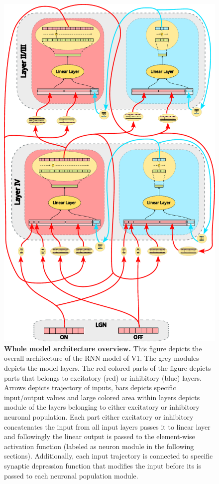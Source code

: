 \begin{figure}
    \centering
    \includegraphics[width=0.85\linewidth]{img/model_architecture.pdf}
    \caption{\textbf{Whole model architecture overview.} This figure depicts the overall architecture of the RNN model of V1. The grey modules depicts the model layers. The red colored parts of the figure depicts parts that belongs to excitatory (red) or inhibitory (blue) layers. Arrows depicts trajectory of inputs, bars depicts specific input/output values and large colored area within layers depicts module of the layers belonging to either excitatory or inhibitory neuronal population. Each part either excitatory or inhibitory concatenates the input from all input layers passes it to linear layer and followingly the linear output is passed to the element-wise activation function (labeled as neuron module in the following sections). Additionally, each input trajectory is connected to specific synaptic depression function that modifies the input before its is passed to each neuronal population module.}
    \label{fig:model_architecture_overview}
\end{figure}

